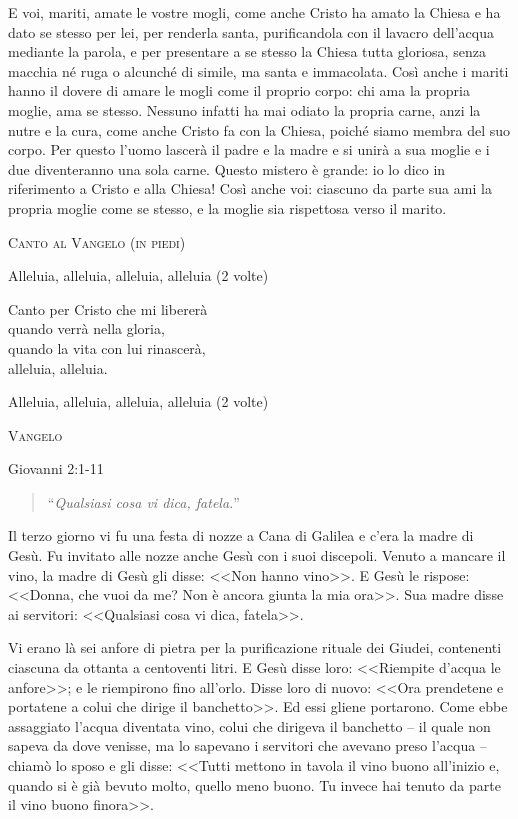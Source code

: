 \documentclass[12pt,twoside]{article}
\newcommand{\masssubpart}[1]{\bigskip

  {\large\scshape #1}}
\newcommand{\reading}[1]{#1}
\newcommand{\readingquote}[1]{
\begin{quote}
``\textit{#1}''
\end{quote}
}
\begin{document}
{E voi, mariti, amate le vostre mogli, come anche Cristo ha amato la Chiesa e ha dato se stesso per lei, per renderla santa, purificandola con il lavacro dell'acqua mediante la parola, e per presentare a se stesso la Chiesa tutta gloriosa, senza macchia né ruga o alcunché di simile, ma santa e immacolata. Così anche i mariti hanno il dovere di amare le mogli come il proprio corpo: chi ama la propria moglie, ama se stesso. Nessuno infatti ha mai odiato la propria carne, anzi la nutre e la cura, come anche Cristo fa con la Chiesa, poiché siamo membra del suo corpo. Per questo l'uomo lascerà il padre e la madre e si unirà a sua moglie e i due diventeranno una sola carne. Questo mistero è grande: io lo dico in riferimento a Cristo e alla Chiesa! Così anche voi: ciascuno da parte sua ami la propria moglie come se stesso, e la moglie sia rispettosa verso il marito.

\masssubpart{Canto al Vangelo (in piedi)}

Alleluia, alleluia, alleluia, alleluia (2 volte)

Canto per Cristo che mi libererà\\
quando verrà nella gloria,\\
quando la vita con lui rinascerà,\\
alleluia, alleluia.

Alleluia, alleluia, alleluia, alleluia (2 volte)

\newpage

\masssubpart{Vangelo}

\reading{Giovanni 2:1-11}
\readingquote{Qualsiasi cosa vi dica, fatela.}

Il terzo giorno vi fu una festa di nozze a Cana di Galilea e c'era la madre di Gesù. Fu invitato alle nozze anche Gesù con i suoi discepoli. Venuto a mancare il vino, la madre di Gesù gli disse: <<Non hanno vino>>. E Gesù le rispose: <<Donna, che vuoi da me? Non è ancora giunta la mia ora>>. Sua madre disse ai servitori: <<Qualsiasi cosa vi dica, fatela>>.

Vi erano là sei anfore di pietra per la purificazione rituale dei Giudei, contenenti ciascuna da ottanta a centoventi litri. E Gesù disse loro: <<Riempite d'acqua le anfore>>; e le riempirono fino all'orlo. Disse loro di nuovo: <<Ora prendetene e portatene a colui che dirige il banchetto>>. Ed essi gliene portarono. Come ebbe assaggiato l'acqua diventata vino, colui che dirigeva il banchetto -- il quale non sapeva da dove venisse, ma lo sapevano i servitori che avevano preso l'acqua -- chiamò lo sposo e gli disse: <<Tutti mettono in tavola il vino buono all'inizio e, quando si è già bevuto molto, quello meno buono. Tu invece hai tenuto da parte il vino buono finora>>.

}
\end{document}
